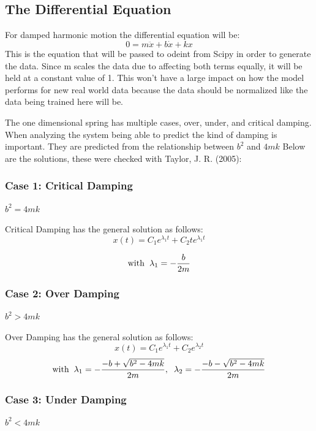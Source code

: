 \documentclass[12pt]{article}
\begin{document}
	\subsection*{The Differential Equation}

	For damped harmonic motion the differential equation will be:
	\begin{equation}
	0 = m\ddot{x}+ b\dot{x} + kx
	\end{equation}
	This is the equation that will be passed to odeint from Scipy in order to generate the data. Since m scales the data due to affecting both terms equally, it will be held at a constant value of 1. This won't have a large impact on how the model performs for new real world data because the data should be normalized like the data being trained here will be.


	The one dimensional spring has multiple cases, over, under, and critical damping. When analyzing the system being able to predict the kind of damping is important. They are predicted from the relationship between $b^2$ and $4mk$ Below are the solutions, these were checked with Taylor, J. R. (2005):

	\subsubsection*{Case 1: Critical Damping}
	$b^2 = 4mk$

	Critical Damping has the general solution as follows:
	\begin{equation}
	x(t) = C_1e^{\lambda_1t} +C_2te^{\lambda_1t} 
	\end{equation}

	$$ \text{with}\hspace{2mm}\lambda_1 = -\dfrac{b}{2m}$$

	\subsubsection*{Case 2: Over Damping}
	$b^2 > 4mk$

	Over Damping has the general solution as follows:
	\begin{equation}
	 x(t) =  C_1e^{\lambda_1t} +C_2e^{\lambda_2t} 
	\end{equation}
	$$ \text{with}\hspace{2mm} \lambda_1 = -\dfrac{-b + \sqrt{b^2-4mk}}{2m}, \hspace{2mm} \lambda_2 = -\dfrac{-b - \sqrt{b^2-4mk}}{2m} $$

	\subsubsection*{Case 3: Under Damping}
	$b^2 < 4mk$
\end{document}
